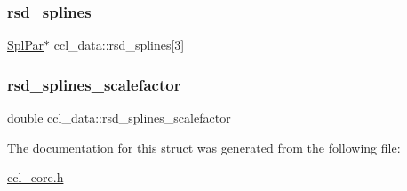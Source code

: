 \mbox{\label{structccl__data_ac655eaa75acfd755a45bb39e2344d800}} 
\subsubsection{\texorpdfstring{rsd\+\_\+splines}{rsd\_splines}}
{\footnotesize\ttfamily \mbox{\hyperlink{struct_spl_par}{Spl\+Par}}$\ast$ ccl\+\_\+data\+::rsd\+\_\+splines\mbox{[}3\mbox{]}}

\mbox{\label{structccl__data_ad599220fa8b248458b36d48906b75d1d}} 
\subsubsection{\texorpdfstring{rsd\+\_\+splines\+\_\+scalefactor}{rsd\_splines\_scalefactor}}
{\footnotesize\ttfamily double ccl\+\_\+data\+::rsd\+\_\+splines\+\_\+scalefactor}



The documentation for this struct was generated from the following file\+:\begin{DoxyCompactItemize}
\item 
\mbox{\hyperlink{ccl__core_8h}{ccl\+\_\+core.\+h}}\end{DoxyCompactItemize}
